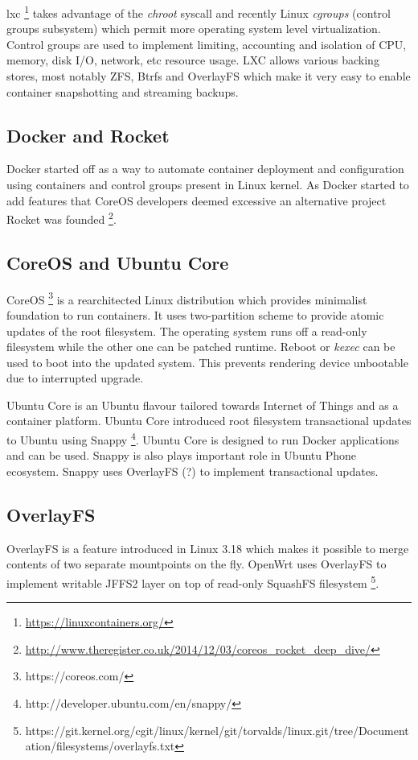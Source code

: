 \documentclass[a4paper,11pt]{kth-mag}
\begin{document}
\gls{lxc}
\footnote{\url{https://linuxcontainers.org/}}
takes advantage of the \emph{chroot} syscall and
recently Linux \emph{cgroups} (control groups subsystem) which permit
more  operating system level virtualization.
Control groups are used to implement limiting, accounting
and isolation of CPU, memory, disk I/O, network, etc resource usage.
LXC allows various backing stores, most notably ZFS, Btrfs and
OverlayFS which make it very easy to enable container
snapshotting and streaming backups.

\subsection{Docker and Rocket}

Docker started off as a way to automate container deployment and
configuration using containers and control groups present in Linux
kernel. As Docker started to add features that CoreOS developers
deemed excessive an alternative project Rocket was founded
\footnote{\url{http://www.theregister.co.uk/2014/12/03/coreos_rocket_deep_dive/}}.

\subsection{CoreOS and Ubuntu Core}

CoreOS \footnote{https://coreos.com/} is a rearchitected Linux
distribution which provides minimalist foundation to run containers.
It uses two-partition scheme to provide atomic updates of the root
filesystem. The operating system runs off a read-only filesystem
while the other one can be patched runtime. Reboot or \emph{kexec}
can be used to boot into the updated system. This prevents rendering
device unbootable due to interrupted upgrade.

Ubuntu Core is an Ubuntu flavour tailored towards Internet of Things
and as a container platform. Ubuntu Core introduced root filesystem
transactional updates to Ubuntu using Snappy
\footnote{http://developer.ubuntu.com/en/snappy/}.
Ubuntu Core is designed to run Docker applications and can be used.
Snappy is also plays important role in Ubuntu Phone ecosystem.
Snappy uses OverlayFS (?) to implement transactional updates.


\subsection{OverlayFS}

OverlayFS is a feature introduced in Linux 3.18 which makes it
possible to merge contents of two separate mountpoints on the fly.
OpenWrt uses OverlayFS to implement writable JFFS2 layer on top of
read-only SquashFS filesystem
\footnote{https://git.kernel.org/cgit/linux/kernel/git/torvalds/linux.git/tree/Documentation/filesystems/overlayfs.txt}.
\end{document}
